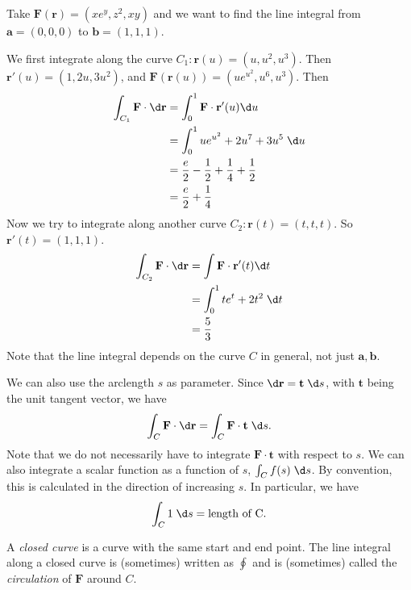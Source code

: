 \documentclass[a4paper]{article}
\begin{document}
\begin{eg}
  Take $\mathbf{F}(\mathbf{r}) = (xe^y, z^2, xy)$ and we want to find the line integral from $\mathbf{a}=(0, 0, 0)$ to $\mathbf{b}=(1, 1, 1)$.
  \begin{center}
  \end{center}
  We first integrate along the curve $C_1: \mathbf{r}(u) = (u, u^2, u^3)$. Then $\mathbf{r}'(u) = (1, 2u, 3u^2)$, and $\mathbf{F}(\mathbf{r}(u)) = (ue^{u^2}, u^6, u^3)$. Then
  \begin{align*}
    \int_{C_1} \mathbf{F}\cdot \d\mathbf{r} &= \int_0^1 \mathbf{F}\cdot\mathbf{r}'(u) \d u\\
    &= \int_0^1 ue^{u^2} + 2u^7 + 3u^5\;\d u\\
    &= \frac{e}{2} -\frac{1}{2} + \frac{1}{4} + \frac{1}{2}\\
    &= \frac{e}{2} + \frac{1}{4}
  \end{align*}
  Now we try to integrate along another curve $C_2: \mathbf{r}(t) = (t, t, t)$. So $\mathbf{r}'(t) = (1,1, 1)$. 
  \begin{align*}
    \int_{C_2} \mathbf{F}\cdot \d \mathbf{r} &= \int \mathbf{F}\cdot \mathbf{r}'(t)\d t\\
    &= \int_0^1 te^t + 2t^2\; \d t\\
    &= \frac{5}{3}
  \end{align*}
  Note that the line integral depends on the curve $C$ in general, not just $\mathbf{a}, \mathbf{b}$.
\end{eg}

We can also use the arclength $s$ as parameter. Since $\d \mathbf{r} = \mathbf{t}\;\d s$, with $\mathbf{t}$ being the unit tangent vector, we have
\[
  \int_C \mathbf{F}\cdot \d \mathbf{r} = \int_C \mathbf{F}\cdot \mathbf{t}\;\d s.
\]
Note that we do not necessarily have to integrate $\mathbf{F}\cdot \mathbf{t}$ with respect to $s$. We can also integrate a scalar function as a function of $s$, $\int_C f(s)\;\d s$. By convention, this is calculated in the direction of increasing $s$. In particular, we have
\[
  \int_C 1\;\d s = \text{length of C}.
\]
\begin{defi}
  A \emph{closed curve} is a curve with the same start and end point. The line integral along a closed curve is (sometimes) written as $\oint$ and is (sometimes) called the \emph{circulation} of $\mathbf{F}$ around $C$.
\end{defi}
\end{document}
